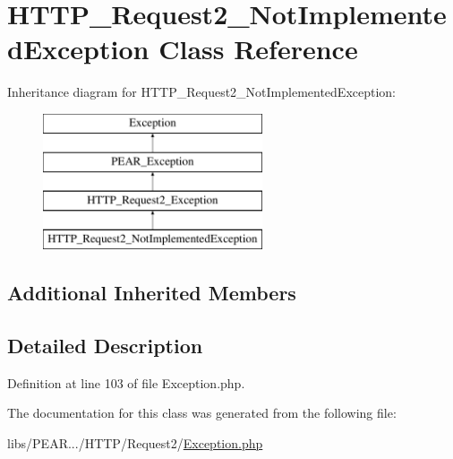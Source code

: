 \hypertarget{classHTTP__Request2__NotImplementedException}{\section{H\-T\-T\-P\-\_\-\-Request2\-\_\-\-Not\-Implemented\-Exception Class Reference}
\label{classHTTP__Request2__NotImplementedException}
}
Inheritance diagram for H\-T\-T\-P\-\_\-\-Request2\-\_\-\-Not\-Implemented\-Exception\-:\begin{figure}[H]
\begin{center}
\leavevmode
\includegraphics[height=4.000000cm]{classHTTP__Request2__NotImplementedException}
\end{center}
\end{figure}
\subsection*{Additional Inherited Members}


\subsection{Detailed Description}


Definition at line 103 of file Exception.\-php.



The documentation for this class was generated from the following file\-:\begin{DoxyCompactItemize}
\item 
libs/\-P\-E\-A\-R.../\-H\-T\-T\-P/\-Request2/\hyperlink{HTTP_2Request2_2Exception_8php}{Exception.\-php}\end{DoxyCompactItemize}
